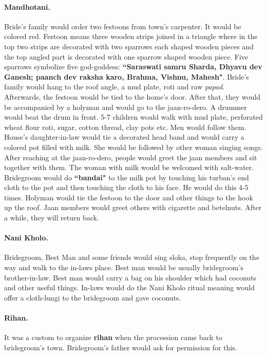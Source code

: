 \paragraph{Mandhotani.} Bride's family would order two festoons from town's
carpenter. It would be colored red. Festoon means three wooden strips joined in
a triangle where in the top two strips are decorated with two sparrows each
shaped wooden pieces and the top angled part is decorated with one sparrow
shaped wooden piece. Five sparrows symbolize five god-goddess:
\textbf{``Saraswati samru Sharda, Dhyavu dev Ganesh; paanch dev raksha karo,
Brahma, Vishnu, Mahesh"}. Bride's family would hang to the roof angle, a mud
plate, roti and raw \textit{papad}. Afterwards, the festoon would be tied to
the home's door. After that, they would be accompanied by a holyman and would
go to the jaan-ro-dero. A drummer would beat the drum in front. 5-7 children
would walk with mud plate, perforated wheat flour roti, sugar, cotton thread,
clay pots etc. Men would follow them. House's daughter-in-law would tie a
decorated head band and would carry a colored pot filled with milk. She would
be followed by other woman singing songs. After reaching at the jaan-ro-dero,
people would greet the jaan members and sit together with them. The woman with
milk would be welcomed with salt-water. Bridegroom would do \textbf{``bandai"} to the
milk pot by touching his turban's end cloth to the pot and then touching the
cloth to his face. He would do this 4-5 times. Holyman would tie the festoon to
the door and other things to the hook up the roof. Jaan members would greet
others with cigarette and betelnuts. After a while, they will return back.

\paragraph{Nani Kholo.} Bridegroom, Best Man and some friends would sing sloka, stop
frequently on the way and walk to the in-laws place. Best man would be usually
bridegroom's brother-in-law. Best man would carry a bag on his shoulder which had
coconuts and other useful things. In-laws would do the Nani Kholo ritual
meaning would offer a cloth-lungi to the bridegroom and gave coconuts.

\paragraph{Rihan.} It was a custom to organize \textbf{rihan} when the
procession came back to bridegroom's town. Bridegroom's father would ask for permission
for this.

